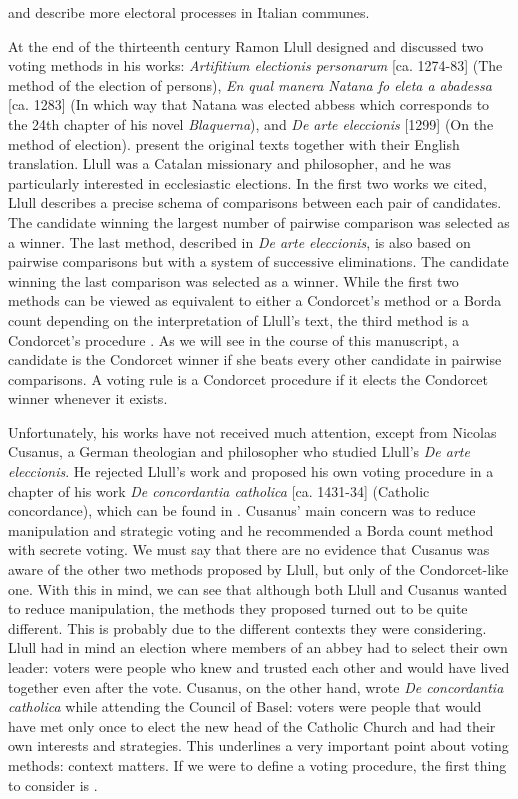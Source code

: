 \citet{Wolfson1899} and \citet{Keller2014} describe more electoral processes in Italian communes. 

At the end of the thirteenth century Ramon Llull designed and discussed two voting methods in his works: \textit{Artifitium electionis personarum} [ca. 1274-83] (The method of the election of persons), \textit{En qual manera Natana fo eleta a abadessa} [ca. 1283] (In which way that Natana was elected abbess which corresponds to the 24th chapter of his novel \textit{Blaquerna}), and \textit{De arte eleccionis} [1299] (On the method of election). \cite{Hagele2001} present the original texts together with their English translation. Llull was a Catalan missionary and philosopher, and he was particularly interested in ecclesiastic elections. In the first two works we cited, Llull describes a precise schema of comparisons between each pair of candidates. The candidate winning the largest number of pairwise comparison was selected as a winner. The last method, described in \textit{De arte eleccionis}, is also based on pairwise comparisons but with a system of successive eliminations. The candidate winning the last comparison was selected as a winner. While the first two methods can be viewed as equivalent to either a Condorcet's method or a Borda count depending on the interpretation of Llull's text, the third method is a Condorcet's procedure \citep{McLean1990}. As we will see in the course of this manuscript, a candidate is the Condorcet winner if she beats every other candidate in pairwise comparisons. A voting rule is a Condorcet procedure if it elects the Condorcet winner whenever it exists.

Unfortunately, his works have not received much attention, except from Nicolas Cusanus, a German theologian and philosopher who studied Llull's \textit{De arte eleccionis}. He rejected Llull's work and proposed his own voting procedure in a chapter of his work \textit{De concordantia catholica} [ca. 1431-34] (Catholic concordance), which can be found in \citet[Chapter 4]{McLeanUrken1995}. Cusanus' main concern was to reduce manipulation and strategic voting and he recommended a Borda count method with secrete voting. We must say that there are no evidence that Cusanus was aware of the other two methods proposed by Llull, but only of the Condorcet-like one. With this in mind, we can see that although both Llull and Cusanus wanted to reduce manipulation, the methods they proposed turned out to be quite different.
This is probably due to the different contexts they were considering. Llull had in mind an election where members of an abbey had to select their own leader: voters were people who knew and trusted each other and would have lived together even after the vote. Cusanus, on the other hand, wrote \textit{De concordantia catholica} while attending the Council of Basel: voters were people that would have met only once to elect the new head of the Catholic Church and had their own interests and strategies. This underlines a very important point about voting methods: context matters. If we were to define a voting procedure, the first thing to consider is .
